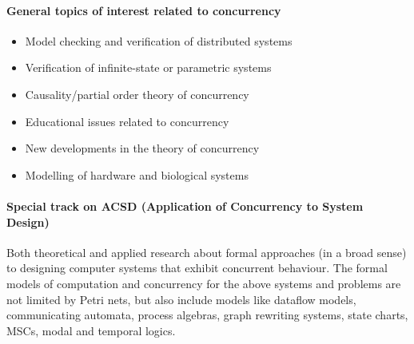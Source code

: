 \documentclass[10pt]{article}
\begin{document}
\begin{multicols}{2}
\columnbreak
\paragraph*{General topics of interest related to concurrency}

\begin{itemize}[leftmargin=*]
\item Model checking and verification of distributed systems
\item Verification of infinite-state or parametric systems
\item Causality/partial order theory of concurrency
\item Educational issues related to concurrency
\item New developments in the theory of concurrency
\item Modelling of hardware and biological systems
\end{itemize}

\vspace*{-0.5cm}
\paragraph*{Special track on ACSD (Application of Concurrency to System Design)}
Both theoretical and applied research about formal approaches (in a broad sense) to designing computer systems that exhibit concurrent behaviour.
The formal models of computation and concurrency for the above systems and problems are not limited by Petri nets, but also include models like dataflow models, communicating automata, process algebras, graph rewriting systems, state charts, MSCs, modal and temporal logics.


\end{multicols}
\end{document}
